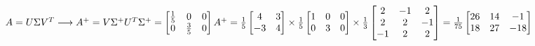 \setLTR
$
A=U\Sigma V^T \longrightarrow A^+=V\Sigma^+U^T \\ \\
\Sigma^+ = \begin{bmatrix}
\frac{1}{5} & 0 & 0 \\
0 & \frac{3}{5} & 0
\end{bmatrix}\\
A^+ = \frac{1}{5}\begin{bmatrix}
	4 & 3 \\
	-3 & 4
\end{bmatrix} \times \frac{1}{5} \begin{bmatrix}
1 & 0 & 0 \\
0 & 3 & 0
\end{bmatrix}
\times \frac{1}{3} \begin{bmatrix}
2 & -1 &  2 \\
2 & 2 & -1 \\
-1 & 2 & 2 
\end{bmatrix} = 
\frac{1}{75} \begin{bmatrix}
26 & 14 & -1 \\
18 & 27 & -18  
\end{bmatrix}
$
\setRTL











